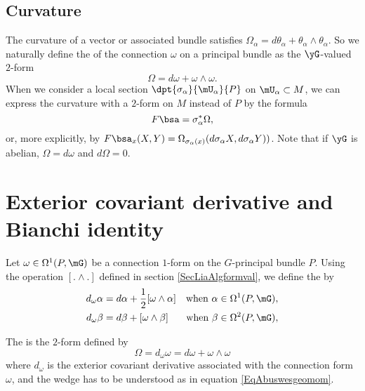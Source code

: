 \subsection{Curvature}

The curvature of a vector or associated bundle satisfies $\Omega_{\alpha}=d\theta_{\alpha}+\theta_{\alpha}\wedge\theta_{\alpha}$. So we naturally define the  of the connection $\omega$ on a principal bundle as the $\yG$-valued $2$-form
\begin{equation} 
  \Omega=d\omega+\omega\wedge\omega.
\end{equation}
When we consider a local section\label{PgLocSecCurv} $\dpt{\sigma_{\alpha}}{\mU_{\alpha}}{P}$ on $\mU_{\alpha}\subset M$, we can express the curvature with a $2$-form on $M$ instead of $P$ by the formula \label{pg:curv_princ}
\[ 
 F\bsa=\sigma_{\alpha}^*\Omega,
\]
or, more explicitly, by $F\bsa_x(X,Y)=\Omega_{\sigma_{\alpha}(x)}(d\sigma_{\alpha} X,d\sigma_{\alpha} Y))$. Note that if $\yG$ is abelian, $\Omega=d\omega$ and $d\Omega=0$.

\section{Exterior covariant derivative and Bianchi identity} 

Let $\omega\in\Omega^1(P,\mG)$ be a connection $1$-form on the $G$-principal bundle $P$. Using the operation $[.\wedge .]$ defined in section \ref{SecLiaAlgformval}, we define the  by  %
\begin{align}
d_{\omega}\alpha&=d\alpha+\frac{ 1 }{2}[\omega\wedge\alpha]&\text{when $\alpha\in\Omega^1(P,\mG)$},\\
d_{\omega}\beta&=d\beta+[\omega\wedge\beta]&\text{when $\beta\in\Omega^2(P,\mG)$},
\end{align}

The  is the $2$-form defined by
\begin{equation}
\Omega=d_{\omega}\omega=d\omega+\omega\wedge\omega
\end{equation}
where $d_{\omega}$ is the exterior covariant derivative associated with the connection form $\omega$, and the wedge has to be understood as in equation \eqref{EqAbuswesgeomom}.

